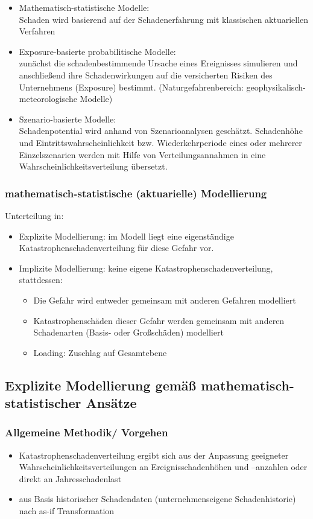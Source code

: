 \documentclass[12pt]{report}
\theoremstyle{dotless}
\theoremstyle{definition}
\begin{document}
\begin{itemize}
\item Mathematisch-statistische Modelle: \\
Schaden wird basierend auf der Schadenerfahrung mit klassischen aktuariellen Verfahren
\item Exposure-basierte probabilitische Modelle: \\
zunächst die schadenbestimmende Ursache eines Ereignisses simulieren und anschließend ihre Schadenwirkungen auf die versicherten Risiken des Unternehmens (Exposure) bestimmt. (Naturgefahrenbereich: geophysikalisch-meteorologische Modelle)
\item Szenario-basierte Modelle: \\
Schadenpotential wird anhand von Szenarioanalysen geschätzt. Schadenhöhe und Eintrittswahrscheinlichkeit bzw. Wiederkehrperiode eines oder mehrerer Einzelszenarien werden mit Hilfe von Verteilungsannahmen in eine Wahrscheinlichkeitsverteilung übersetzt.
\end{itemize}


\subsubsection{mathematisch-statistische (aktuarielle) Modellierung}
Unterteilung in:
\begin{itemize}
\item Explizite Modellierung: im Modell liegt eine eigenständige Katastrophenschadenverteilung für diese Gefahr vor.
\item Implizite Modellierung: keine eigene Katastrophenschadenverteilung, stattdessen: 
\begin{itemize}
\item Die Gefahr wird entweder gemeinsam mit anderen Gefahren modelliert
\item Katastrophenschäden dieser Gefahr werden gemeinsam mit anderen Schadenarten (Basis- oder Großschäden) modelliert
\item Loading: Zuschlag auf Gesamtebene
\end{itemize}
\end{itemize}


\subsection{Explizite Modellierung gemäß mathematisch-statistischer Ansätze}

\subsubsection{Allgemeine Methodik/ Vorgehen}
\begin{itemize}
\item Katastrophenschadenverteilung ergibt sich aus der Anpassung geeigneter Wahrscheinlichkeitsverteilungen an Ereignisschadenhöhen und –anzahlen oder direkt an Jahresschadenlast
\item aus Basis historischer Schadendaten (unternehmenseigene Schadenhistorie) nach as-if Transformation
\end{itemize}
\end{document}
